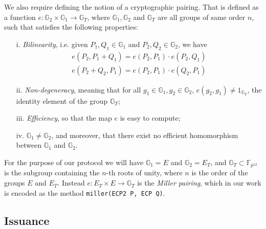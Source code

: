 We also require defining the notion of a cryptographic
pairing. That is defined as a function $e:
\mathbb{G}_2\times\mathbb{G}_1\to \mathbb{G}_T$, where
$\mathbb{G}_1,\mathbb{G}_2$ and $\mathbb{G}_T$ are all groups of same
order $n$, such that satisfies the following properties:

\begin{itemize}

\item [i.] \emph{Bilinearity}, i.e. given $P_1,Q_1\in\mathbb{G}_1$
  and $P_2,Q_2\in\mathbb{G}_2$, we have
  \begin{align*}
    e(P_2,P_1+Q_1) = e(P_2,P_1)\cdot e(P_2,Q_1)   \\
    e(P_2+Q_2,P_1) = e(P_2,P_1)\cdot e(Q_2,P_1)
  \end{align*}

\item[ii.] \emph{Non-degeneracy}, meaning that for all
  $g_1\in\mathbb{G}_1, g_2\in\mathbb{G}_2$, $e(g_2,g_1)\ne
  1_{\mathbb{G}_T}$, the identity element of the group
  $\mathbb{G}_T$;

\item[iii.] \emph{ Efficiency}, so that the map $e$ is easy to
  compute;

\item[iv. ] $\mathbb{G}_1\ne \mathbb{G}_2$, and moreover, that
  there exist no efficient homomorphism between $\mathbb{G}_1$ and
  $\mathbb{G}_2$.

\end{itemize}

For the purpose of our protocol we will have $\mathbb{G}_1 = E$ and
$\mathbb{G}_2 = E_T$, and $\mathbb{G}_T\subset \mathbb{F}_{p^{12}}$ is
the subgroup containing the $n$-th roots of unity, where $n$ is the
order of the groups $E$ and $E_T$. Instead $e: E_T \times E\to
\mathbb{G}_T$ is the \emph{Miller pairing}, which in our work is
encoded as the method \verb!miller(ECP2 P, ECP Q)!. \\


\subsection{Issuance} \label{issuance}

